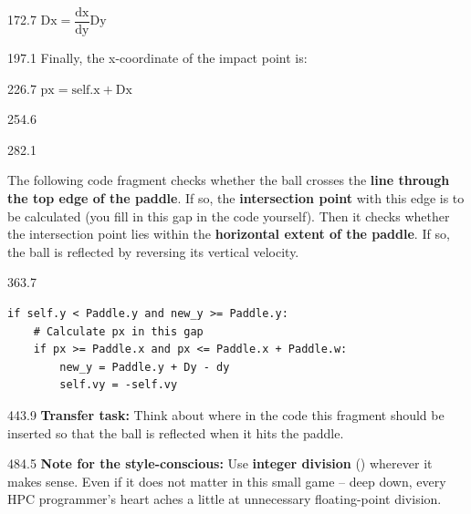 \documentclass{aslab}
\begin{document}
\begin{region}{172.7}
\centering $\text{Dx} = \dfrac{\text{dx}}{\text{dy}}\text{Dy}$
\end{region}

\begin{region}{197.1}
Finally, the x-coordinate of the impact point is:
\end{region}

\begin{region}{226.7}
\centering $\text{px} = \text{self.x} + \text{Dx}$
\end{region}

\begin{region}{254.6}
\end{region}

\begin{region}[pitch=13.75]{282.1}
\begin{ntasks}
\item The following code fragment checks whether the ball crosses the
  \textbf{line through the top edge of the paddle}. If so, the
  \textbf{intersection point} with this edge is to be calculated (you fill in
  this gap in the code yourself). Then it checks whether the intersection
  point lies within the \textbf{horizontal extent of the paddle}. If so, the
  ball is reflected by reversing its vertical velocity.
\end{ntasks}
\end{region}

\begin{region}[x=74.7,right=0,pitch=13.2]{363.7}
\begin{lstlisting}[style=py]
if self.y < Paddle.y and new_y >= Paddle.y:
    # Calculate px in this gap
    if px >= Paddle.x and px <= Paddle.x + Paddle.w:
        new_y = Paddle.y + Dy - dy
        self.vy = -self.vy
\end{lstlisting}
\end{region}

\begin{region}[x=74.7,right=0,pitch=13.3]{443.9}
\textbf{Transfer task:} Think about where in the code this fragment should be
inserted so that the ball is reflected when it hits the paddle.
\end{region}

\begin{region}[x=74.7,right=0,pitch=13.25]{484.5}
\textbf{Note for the style-conscious:} Use \textbf{integer division}
(\code{//}) wherever it makes sense. Even if it does not matter in this small
game -- deep down, every HPC programmer's heart aches a little at unnecessary
floating-point division.
\end{region}
\end{document}
